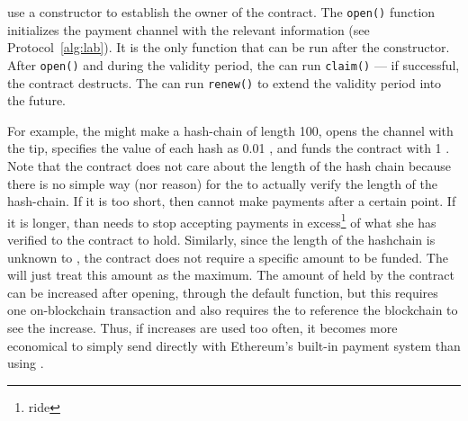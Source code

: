 \ew use a constructor to establish the owner of the contract. The \texttt{open()} function initializes the payment channel with the relevant information (see Protocol~\ref{alg:lab}). It is the only function that can be run after the constructor. After \texttt{open()} and during the validity period, the \take can run \texttt{claim()} --- if successful, the contract destructs. The \make can run \texttt{renew()} to extend the validity period into the future. 

For example, the \make might make a hash-chain of length 100, opens the channel with the tip, specifies the value of each hash as 0.01 \eth, and funds the contract with 1 \eth. Note that the contract does not care about the length of the hash chain because there is no simple way (nor reason) for the \take to actually verify the length of the hash-chain. If it is too short, then \make cannot make payments after a certain point. If it is longer, than \take needs to stop accepting payments in excess\footnote{ride} of what she has verified to the contract to hold. Similarly, since the length of the hashchain is unknown to \take, the contract does not require a specific amount to be funded. The \take will just treat this amount as the maximum. The amount of \eth held by the contract can be increased after opening, through the default function, but this requires one on-blockchain transaction and also requires the \take to reference the blockchain to see the increase. Thus, if increases are used too often, it becomes more economical to simply send \eth directly with Ethereum's built-in payment system than using \ew.

